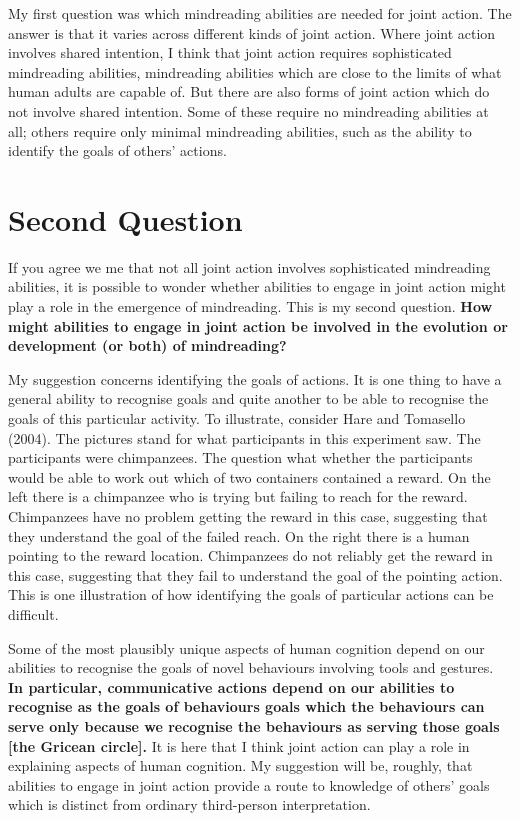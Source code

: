 \documentclass[12pt,a4paper]{extarticle}
\begin{document}
My first question was which mindreading abilities are needed for joint action.
The answer is that it varies across different kinds of joint action.
Where joint action involves shared intention, I think that joint action requires sophisticated mindreading abilities, mindreading abilities which are close to the limits of what human adults are capable of.
But there are also forms of joint action which do not involve shared intention.
Some of these require no mindreading abilities at all; others require only minimal mindreading abilities, such as the ability to identify the goals of others' actions.



\section{Second Question}

If you agree we me that not all joint action involves sophisticated mindreading abilities, it is possible to wonder whether abilities to engage in joint action might play a role in the emergence of mindreading.  This is my second question.  \textbf{How might abilities to engage in joint action be involved in the evolution or development (or both) of mindreading?}

My suggestion concerns identifying the goals of actions. 
It is one thing to have a general ability to recognise goals and quite another to be able to recognise the goals of this particular activity.
To illustrate, consider Hare and Tomasello (2004).
The pictures stand for what participants in this experiment saw.
The participants were chimpanzees.
The question what whether the participants would be able to work out which of two containers contained a reward.
On the left there is a chimpanzee who is trying but failing to reach for the reward. 
Chimpanzees have no problem getting the reward in this case, suggesting that they understand the goal of the failed reach.
On the right there is a human pointing to the reward location.
Chimpanzees do not reliably  get the reward in this case, suggesting that they fail to understand the goal of the pointing action.
This is one illustration of how identifying the goals of particular actions can be difficult.
 
Some of the most plausibly unique aspects of human cognition depend on our abilities to recognise the goals of novel behaviours involving tools and gestures.  
\textbf{In particular, communicative actions depend on our abilities to recognise as the goals of behaviours goals which the behaviours can serve only because we recognise the behaviours as serving those goals [the Gricean circle].}
It is here that I think joint action can play a role in explaining aspects of human cognition.  
My suggestion will be, roughly, that abilities to engage in joint action provide a route to knowledge of others’ goals which is distinct from ordinary third-person interpretation.  
\end{document}
